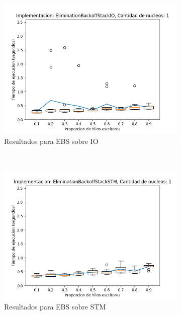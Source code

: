 \begin{appendices}
\begin{figure}[H]
    \centering
    \begin{subfigure}[b]{0.49\textwidth}
        \includegraphics[width=\textwidth]{images/pushPercentages/plots/expEBSIO-1}
        \caption{Resultados para EBS sobre IO}
        \label{subfig:pushPercentages-ebsio-1}
    \end{subfigure}
    ~
    \begin{subfigure}[b]{0.49\textwidth}
        \includegraphics[width=\textwidth]{images/pushPercentages/plots/expEBSSTM-1}
        \caption{Resultados para EBS sobre STM}
        \label{subfig:pushPercentages-ebsstm-1}
    \end{subfigure}
    \begin{subfigure}[b]{0.49\textwidth}

\end{subfigure}
\end{figure}
\end{appendices}
